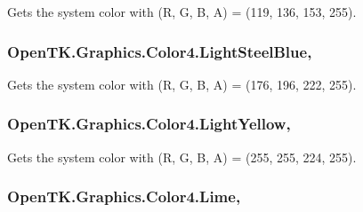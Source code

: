 Gets the system color with (R, G, B, A) = (119, 136, 153, 255). 

\hypertarget{struct_open_t_k_1_1_graphics_1_1_color4_a978f25c8c929db4842c6ee03f8fd26cc}{
\subsubsection[{Light\-Steel\-Blue}]{ Open\-T\-K.\-Graphics.\-Color4.\-Light\-Steel\-Blue\hspace{0.3cm}{\ttfamily [static]}, {\ttfamily [get]}}}\label{struct_open_t_k_1_1_graphics_1_1_color4_a978f25c8c929db4842c6ee03f8fd26cc}


Gets the system color with (R, G, B, A) = (176, 196, 222, 255). 

\hypertarget{struct_open_t_k_1_1_graphics_1_1_color4_a900d25354bc09966822fb83d3f7af327}{
\subsubsection[{Light\-Yellow}]{ Open\-T\-K.\-Graphics.\-Color4.\-Light\-Yellow\hspace{0.3cm}{\ttfamily [static]}, {\ttfamily [get]}}}\label{struct_open_t_k_1_1_graphics_1_1_color4_a900d25354bc09966822fb83d3f7af327}


Gets the system color with (R, G, B, A) = (255, 255, 224, 255). 

\hypertarget{struct_open_t_k_1_1_graphics_1_1_color4_a7fb0b01fe855adff40c03530f20b2219}{
\subsubsection[{Lime}]{ Open\-T\-K.\-Graphics.\-Color4.\-Lime\hspace{0.3cm}{\ttfamily [static]}, {\ttfamily [get]}}}\label{struct_open_t_k_1_1_graphics_1_1_color4_a7fb0b01fe855adff40c03530f20b2219}


